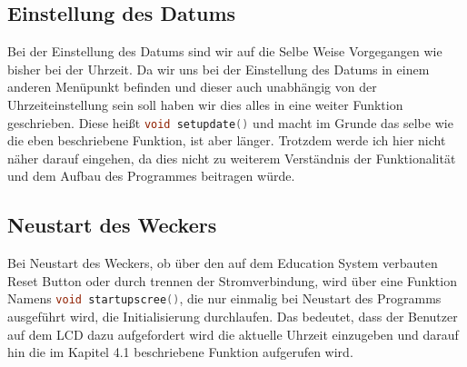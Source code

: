 \documentclass[openright,twoside,12pt,a4paper]{scrartcl}
\begin{document}
\begin{flushleft}
	 	\subsection{Einstellung des Datums}
	 	Bei der Einstellung des Datums sind wir auf die Selbe Weise Vorgegangen wie bisher bei der Uhrzeit. Da wir uns bei der Einstellung des Datums in einem anderen Menüpunkt befinden und dieser auch unabhängig von der Uhrzeiteinstellung sein soll haben wir dies alles in eine weiter Funktion geschrieben. Diese heißt \lstinline[language=c++,]|void setupdate()| und macht im Grunde das selbe wie die eben beschriebene Funktion, ist aber länger. Trotzdem werde ich hier nicht näher darauf eingehen, da dies nicht zu weiterem Verständnis der Funktionalität und dem Aufbau des Programmes beitragen würde.
	 	\subsection{Neustart des Weckers}
	 	Bei Neustart des Weckers, ob über den auf dem Education System verbauten Reset Button oder durch trennen der Stromverbindung, wird über eine Funktion Namens \lstinline[language=c++]|void startupscree()|, die nur einmalig bei Neustart des Programms ausgeführt wird, die Initialisierung durchlaufen. Das bedeutet, dass der Benutzer auf dem LCD dazu aufgefordert wird die aktuelle Uhrzeit einzugeben und darauf hin die im Kapitel 4.1 beschriebene Funktion aufgerufen wird. 
	\end{flushleft}
\end{document}
